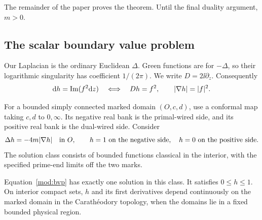 The remainder of the paper proves the theorem. Until the final
duality argument, $m>0$.

\subsection{The scalar boundary value problem}
Our Laplacian is the ordinary Euclidean $\Delta$. Green functions
are for $-\Delta$, so their logarithmic singularity has coefficient
$1/(2\pi)$. We write $D=2\ii\partial_z$. Consequently
\begin{equation}\label{mod:square-gradient}
 \mathrm d h=\operatorname{Im}(f^2\mathrm d z)\quad\Longleftrightarrow\quad Dh=f^2,
 \qquad |\nabla h|=|f|^2.
\end{equation}

For a bounded simply connected marked domain $(O,c,d)$, use a
conformal map taking $c,d$ to $0,\infty$. Its negative real bank
is the primal-wired side, and its positive real bank is the
dual-wired side. Consider
\begin{equation}\label{mod:bvp}
 \Delta h=-4m|\nabla h|\quad\hbox{in }O,\qquad
 h=1\text{ on the negative side},\quad
 h=0\text{ on the positive side}.
\end{equation}
The solution class consists of bounded functions classical in the
interior, with the specified prime-end limits off the two marks.

\begin{proposition}\label{mod:bvp-unique}
Equation~\eqref{mod:bvp} has exactly one solution in this class.
It satisfies $0\le h\le1$. On interior compact sets, $h$ and its
first derivatives depend continuously on the marked domain in the
Carath\'eodory topology, when the domains lie in a fixed bounded
physical region.
\end{proposition}

